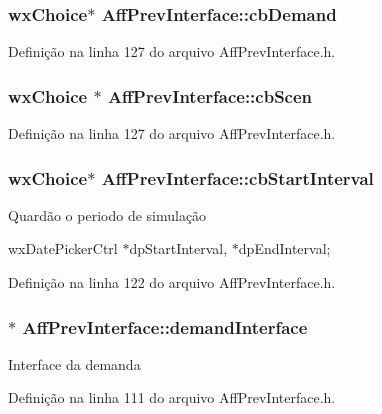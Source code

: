 \subsubsection[{cb\+Demand}]{\setlength{\rightskip}{0pt plus 5cm}wx\+Choice$\ast$ Aff\+Prev\+Interface\+::cb\+Demand}\label{class_aff_prev_interface_ac42bd563363e16fc42b76ba6e8f78b86}


Definição na linha 127 do arquivo Aff\+Prev\+Interface.\+h.

\subsubsection[{cb\+Scen}]{\setlength{\rightskip}{0pt plus 5cm}wx\+Choice $\ast$ Aff\+Prev\+Interface\+::cb\+Scen}\label{class_aff_prev_interface_a56babda88c834e12b34a4d076f09d092}


Definição na linha 127 do arquivo Aff\+Prev\+Interface.\+h.

\subsubsection[{cb\+Start\+Interval}]{\setlength{\rightskip}{0pt plus 5cm}wx\+Choice$\ast$ Aff\+Prev\+Interface\+::cb\+Start\+Interval}\label{class_aff_prev_interface_a2c3080c35fa5e81efd5f452dbc7708c8}
Quardão o periodo de simulação

wx\+Date\+Picker\+Ctrl $\ast$dp\+Start\+Interval, $\ast$dp\+End\+Interval; 

Definição na linha 122 do arquivo Aff\+Prev\+Interface.\+h.

\subsubsection[{demand\+Interface}]{$\ast$ Aff\+Prev\+Interface\+::demand\+Interface}\label{class_aff_prev_interface_a496716deb736d9ceace6ac1d33f398a1}
Interface da demanda 

Definição na linha 111 do arquivo Aff\+Prev\+Interface.\+h.

